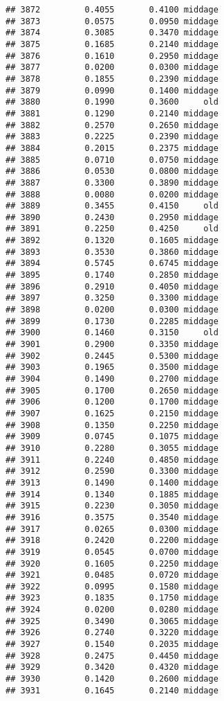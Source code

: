 \documentclass[
]{article}
\begin{document}
\begin{verbatim}
## 3872         0.4055       0.4100 middage
## 3873         0.0575       0.0950 middage
## 3874         0.3085       0.3470 middage
## 3875         0.1685       0.2140 middage
## 3876         0.1610       0.2950 middage
## 3877         0.0200       0.0300 middage
## 3878         0.1855       0.2390 middage
## 3879         0.0990       0.1400 middage
## 3880         0.1990       0.3600     old
## 3881         0.1290       0.2140 middage
## 3882         0.2570       0.2650 middage
## 3883         0.2225       0.2390 middage
## 3884         0.2015       0.2375 middage
## 3885         0.0710       0.0750 middage
## 3886         0.0530       0.0800 middage
## 3887         0.3300       0.3890 middage
## 3888         0.0080       0.0200 middage
## 3889         0.3455       0.4150     old
## 3890         0.2430       0.2950 middage
## 3891         0.2250       0.4250     old
## 3892         0.1320       0.1605 middage
## 3893         0.3530       0.3860 middage
## 3894         0.5745       0.6745 middage
## 3895         0.1740       0.2850 middage
## 3896         0.2910       0.4050 middage
## 3897         0.3250       0.3300 middage
## 3898         0.0200       0.0300 middage
## 3899         0.1730       0.2285 middage
## 3900         0.1460       0.3150     old
## 3901         0.2900       0.3350 middage
## 3902         0.2445       0.5300 middage
## 3903         0.1965       0.3500 middage
## 3904         0.1490       0.2700 middage
## 3905         0.1700       0.2650 middage
## 3906         0.1200       0.1700 middage
## 3907         0.1625       0.2150 middage
## 3908         0.1350       0.2250 middage
## 3909         0.0745       0.1075 middage
## 3910         0.2280       0.3055 middage
## 3911         0.2240       0.4850 middage
## 3912         0.2590       0.3300 middage
## 3913         0.1490       0.1400 middage
## 3914         0.1340       0.1885 middage
## 3915         0.2230       0.3050 middage
## 3916         0.3575       0.3540 middage
## 3917         0.0265       0.0300 middage
## 3918         0.2420       0.2200 middage
## 3919         0.0545       0.0700 middage
## 3920         0.1605       0.2250 middage
## 3921         0.0485       0.0720 middage
## 3922         0.0995       0.1580 middage
## 3923         0.1835       0.1750 middage
## 3924         0.0200       0.0280 middage
## 3925         0.3490       0.3065 middage
## 3926         0.2740       0.3220 middage
## 3927         0.1540       0.2035 middage
## 3928         0.2475       0.4450 middage
## 3929         0.3420       0.4320 middage
## 3930         0.1420       0.2600 middage
## 3931         0.1645       0.2140 middage

\end{verbatim}
\end{document}
